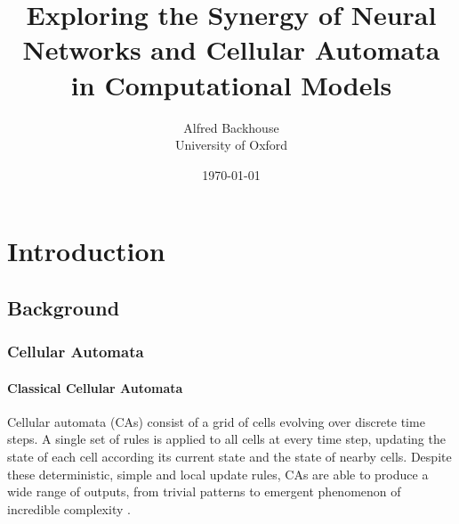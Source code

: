 \documentclass[12pt]{report}
\title{Exploring the Synergy of Neural Networks and Cellular Automata in Computational Models}
\author{Alfred Backhouse \\ University of Oxford}
\date{\today}
\begin{document}
\maketitle

\begin{abstract}
\end{abstract}

\tableofcontents
\newpage

\chapter{Introduction}



\section{Background}

\subsection{Cellular Automata}

\subsubsection{Classical Cellular Automata}
Cellular automata (CAs) consist of a grid of cells evolving over discrete time steps. A single set of rules is applied to all cells at every time step, updating the state of each cell according its current state and the state of nearby cells. Despite these deterministic, simple and local update rules, CAs are able to produce a wide range of outputs, from trivial patterns to emergent phenomenon of incredible complexity \citep{Wolfram2002}. 
\end{document}
